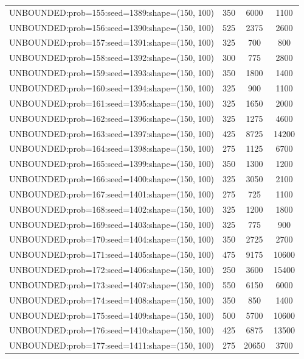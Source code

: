\begin{longtable}{lccc}
UNBOUNDED:prob=155:seed=1389:shape=(150, 100) &      350 &  6000 &   1100 \\
UNBOUNDED:prob=156:seed=1390:shape=(150, 100) &      525 &  2375 &   2600 \\
UNBOUNDED:prob=157:seed=1391:shape=(150, 100) &      325 &   700 &    800 \\
UNBOUNDED:prob=158:seed=1392:shape=(150, 100) &      300 &   775 &   2800 \\
UNBOUNDED:prob=159:seed=1393:shape=(150, 100) &      350 &  1800 &   1400 \\
UNBOUNDED:prob=160:seed=1394:shape=(150, 100) &      325 &   900 &   1100 \\
UNBOUNDED:prob=161:seed=1395:shape=(150, 100) &      325 &  1650 &   2000 \\
UNBOUNDED:prob=162:seed=1396:shape=(150, 100) &      325 &  1275 &   4600 \\
UNBOUNDED:prob=163:seed=1397:shape=(150, 100) &      425 &  8725 &  14200 \\
UNBOUNDED:prob=164:seed=1398:shape=(150, 100) &      275 &  1125 &   6700 \\
UNBOUNDED:prob=165:seed=1399:shape=(150, 100) &      350 &  1300 &   1200 \\
UNBOUNDED:prob=166:seed=1400:shape=(150, 100) &      325 &  3050 &   2100 \\
UNBOUNDED:prob=167:seed=1401:shape=(150, 100) &      275 &   725 &   1100 \\
UNBOUNDED:prob=168:seed=1402:shape=(150, 100) &      325 &  1200 &   1800 \\
UNBOUNDED:prob=169:seed=1403:shape=(150, 100) &      325 &   775 &    900 \\
UNBOUNDED:prob=170:seed=1404:shape=(150, 100) &      350 &  2725 &   2700 \\
UNBOUNDED:prob=171:seed=1405:shape=(150, 100) &      475 &  9175 &  10600 \\
UNBOUNDED:prob=172:seed=1406:shape=(150, 100) &      250 &  3600 &  15400 \\
UNBOUNDED:prob=173:seed=1407:shape=(150, 100) &      550 &  6150 &   6000 \\
UNBOUNDED:prob=174:seed=1408:shape=(150, 100) &      350 &   850 &   1400 \\
UNBOUNDED:prob=175:seed=1409:shape=(150, 100) &      500 &  5700 &  10600 \\
UNBOUNDED:prob=176:seed=1410:shape=(150, 100) &      425 &  6875 &  13500 \\
UNBOUNDED:prob=177:seed=1411:shape=(150, 100) &      275 & 20650 &   3700 \\

\end{longtable}
